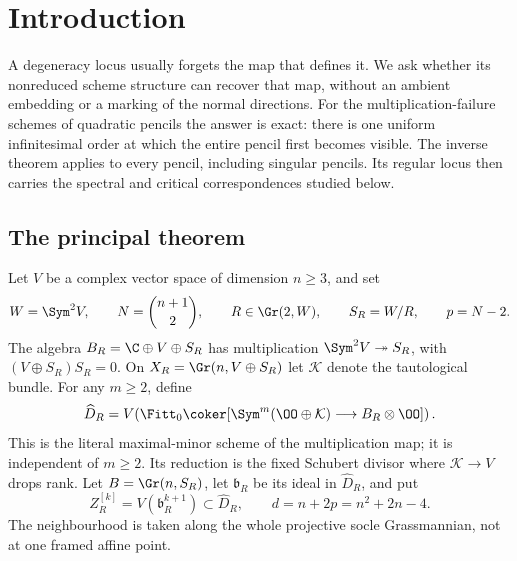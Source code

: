 \section{Introduction}
\label{sec:introduction-v132}

A degeneracy locus usually forgets the map that defines it.  We ask
whether its nonreduced scheme structure can recover that map, without
an ambient embedding or a marking of the normal directions.  For the
multiplication-failure schemes of quadratic pencils the answer is
exact: there is one uniform infinitesimal order at which the entire
pencil first becomes visible.  The inverse theorem applies to every
pencil, including singular pencils.  Its regular locus then carries
the spectral and critical correspondences studied below.

\subsection{The principal theorem}
Let \(V\) be a complex vector space of dimension \(n\ge3\), and set
\[
 W=\Sym^2V,\qquad N=\binom{n+1}{2},\qquad
 R\in\Gr(2,W),\qquad S_R=W/R,\qquad p=N-2.
\]
The algebra \(B_R=\C\oplus V\oplus S_R\) has multiplication
\(\Sym^2V\twoheadrightarrow S_R\), with \((V\oplus S_R)S_R=0\).
On \(X_R=\Gr(n,V\oplus S_R)\) let \(\mathcal K\) denote the
tautological bundle.  For any \(m\ge2\), define
\begin{equation}\label{eq:failure-intro}
 \widehat D_R=
 V\!\left(
 \Fitt_0\coker[
 \Sym^m(\OO\oplus\mathcal K)\longrightarrow
 B_R\otimes\OO]\right).
\end{equation}
This is the literal maximal-minor scheme of the multiplication map;
it is independent of \(m\ge2\).  Its reduction is the fixed
Schubert divisor where \(\mathcal K\to V\) drops rank.  Let
\(B=\Gr(n,S_R)\), let \(\mathfrak b_R\) be its ideal in
\(\widehat D_R\), and put
\[
 Z_R^{[k]}=V(\mathfrak b_R^{k+1})\subset\widehat D_R,
 \qquad d=n+2p=n^2+2n-4.
\]
The neighbourhood is taken along the whole projective socle
Grassmannian, not at one framed affine point.

